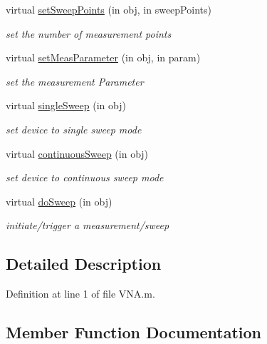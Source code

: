\begin{DoxyCompactItemize}
virtual \hyperlink{class_v_n_a_a1a43307170418a3086aa5e6ed473cee2}{set\+Sweep\+Points} (in obj, in sweep\+Points)
\begin{DoxyCompactList}\small\item\em set the number of measurement points \end{DoxyCompactList}\item 
virtual \hyperlink{class_v_n_a_a1bf13a094f3aa8d91abcc3c9a957fd75}{set\+Meas\+Parameter} (in obj, in param)
\begin{DoxyCompactList}\small\item\em set the measurement Parameter \end{DoxyCompactList}\item 
virtual \hyperlink{class_v_n_a_abe731d1b6260be7b012e2fe5ff77b840}{single\+Sweep} (in obj)
\begin{DoxyCompactList}\small\item\em set device to single sweep mode \end{DoxyCompactList}\item 
virtual \hyperlink{class_v_n_a_a5cd65a46bde54a2f833621e04d5205d6}{continuous\+Sweep} (in obj)
\begin{DoxyCompactList}\small\item\em set device to continuous sweep mode \end{DoxyCompactList}\item 
virtual \hyperlink{class_v_n_a_a637674eb6efd8c3611a489c2a1fac4bc}{do\+Sweep} (in obj)
\begin{DoxyCompactList}\small\item\em initiate/trigger a measurement/sweep \end{DoxyCompactList}\end{DoxyCompactItemize}


\subsection{Detailed Description}


Definition at line 1 of file V\+N\+A.\+m.



\subsection{Member Function Documentation}
\mbox{\label{class_v_n_a_a5cd65a46bde54a2f833621e04d5205d6}} 
